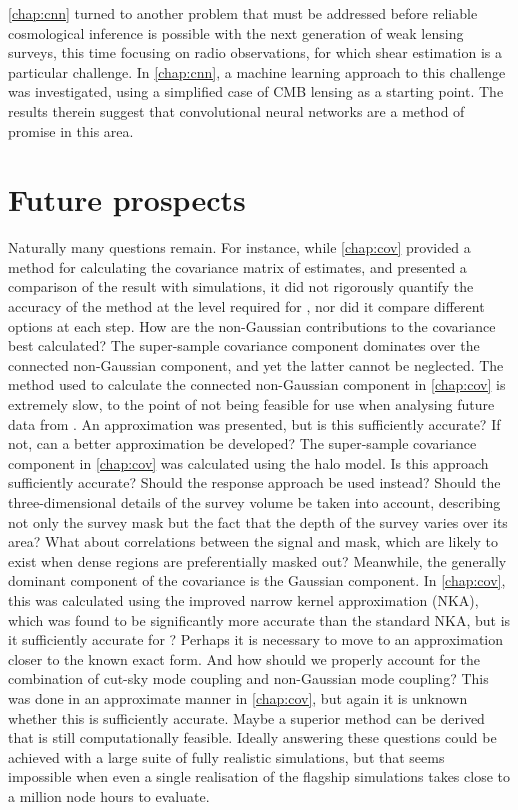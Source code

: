 \autoref{chap:cnn} turned to another problem that must be addressed before reliable cosmological inference is possible with the next generation of weak lensing surveys, this time focusing on radio observations, for which shear estimation is a particular challenge. In \autoref{chap:cnn}, a machine learning approach to this challenge was investigated, using a simplified case of CMB lensing as a starting point. The results therein suggest that convolutional neural networks are a method of promise in this area.

\section{Future prospects}

Naturally many questions remain. For instance, while \autoref{chap:cov} provided a method for calculating the covariance matrix of \pcl{} estimates, and presented a comparison of the result with simulations, it did not rigorously quantify the accuracy of the method at the level required for \Euclid{}, nor did it compare different options at each step. How are the non-Gaussian contributions to the covariance best calculated? The super-sample covariance component dominates over the connected non-Gaussian component, and yet the latter cannot be neglected. The method used to calculate the connected non-Gaussian component in \autoref{chap:cov} is extremely slow, to the point of not being feasible for use when analysing future data from \Euclid{}. An approximation was presented, but is this sufficiently accurate? If not, can a better approximation be developed? The super-sample covariance component in \autoref{chap:cov} was calculated using the halo model. Is this approach sufficiently accurate? Should the response approach be used instead? Should the three-dimensional details of the survey volume be taken into account, describing not only the survey mask but the fact that the depth of the survey varies over its area? What about correlations between the signal and mask, which are likely to exist when dense regions are preferentially masked out? Meanwhile, the generally dominant component of the \pcl{} covariance is the Gaussian component. In \autoref{chap:cov}, this was calculated using the improved narrow kernel approximation (NKA), which was found to be significantly more accurate than the standard NKA, but is it sufficiently accurate for \Euclid{}? Perhaps it is necessary to move to an approximation closer to the known exact form. And how should we properly account for the combination of cut-sky mode coupling and non-Gaussian mode coupling? This was done in an approximate manner in \autoref{chap:cov}, but again it is unknown whether this is sufficiently accurate. Maybe a superior method can be derived that is still computationally feasible. Ideally answering these questions could be achieved with a large suite of fully realistic simulations, but that seems impossible when even a single realisation of the \Euclid{} flagship simulations takes close to a million node hours to evaluate.

